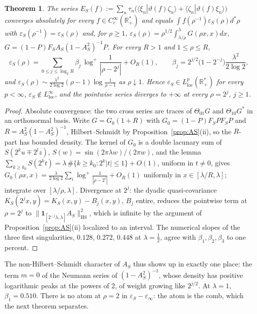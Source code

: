 \documentclass[11pt]{amsart}
\newtheorem{theorem}{Theorem}[section]
\theoremstyle{definition}
\theoremstyle{remark}
\newcommand{\R}{\mathbb R}
\begin{document}
\begin{theorem}\label{thm:L2}
The series $E_S(f):=\sum_n\tau_n\big(\langle\xi_n|\vartheta(f)\zeta_n\rangle+\langle\zeta_n|\vartheta(f)\xi_n\rangle\big)$ converges
absolutely for every $f\in C_c^\infty(\R_+^*)$ and equals $\int f(\rho^{-1})\varepsilon_S(\rho)d^*\rho$ with
$\varepsilon_S(\rho^{-1})=\varepsilon_S(\rho)$ and, for $\rho\ge1$,
$\varepsilon_S(\rho)=\rho^{1/2}\int_{\lambda/\rho}^\lambda G(\rho x,x)dx$, $G=(1-P)F_SA_S(1-A_S^2)^{-1}P$. For every $R>1$ and
$1\le\rho\le R$,
\[
\varepsilon_S(\rho)=\sum_{0\le j\le\log_2R}\beta_j\,\log^+\frac1{|\rho-2^j|}+O_R(1),\qquad
\beta_j=2^{j/2}\big(1-2^{-j}\big)\frac{\lambda^2}{2\log2},
\]
and $\varepsilon_S(\rho)\sim\frac{\lambda^2}{2\log2}(\rho-1)\log\frac1{\rho-1}$ as $\rho\downarrow1$. Hence
$\varepsilon_S\in L^p_{\mathrm{loc}}(\R_+^*)$ for every $p<\infty$, $\varepsilon_S\notin L^\infty_{\mathrm{loc}}$, and the pointwise
series diverges to $+\infty$ at every $\rho=2^j$, $j\ge1$.
\end{theorem}
\begin{proof}
Absolute convergence: the two cross series are traces of $\Theta_{01}G$ and $\Theta_{10}G^*$ in an orthonormal basis.
Write $G=G_0(1+R)$ with $G_0=(1-P)F_SPF_SP$ and $R=A_S^2(1-A_S^2)^{-1}$, Hilbert--Schmidt by Proposition~\ref{prop:AS}(ii), so
the $R$-part has bounded density. The kernel of $G_0$ is a double lacunary sum of $S(2^ku\mp2^lz)$,
$S(w)=\sin(2\pi\lambda w)/(2\pi w)$, and the lemma $\sum_{k\ge k_0}S(2^kt)=\lambda\,\#\{k\ge k_0:2^k|t|\le1\}+O(1)$, uniform in
$t\neq0$, gives $G_0(\rho x,x)=\frac{\lambda}{2\log2}\sum_i\log^+\frac1{|\rho-2^i|}+O_R(1)$ uniformly in $x\in[\lambda/R,\lambda]$;
integrate over $[\lambda/\rho,\lambda]$. Divergence at $2^j$: the dyadic quasi-covariance $K_S(2^jx,y)=K_S(x,y)-B_j(x,y)$, $B_j$
entire, reduces the pointwise term at $\rho=2^j$ to $\|\mathbf 1_{[2^{-j}\lambda,\lambda]}A_S\|_{\mathrm{HS}}^2$, which is infinite
by the argument of Proposition~\ref{prop:AS}(ii) localized to an interval. The numerical slopes of the three first
singularities, $0.128$, $0.272$, $0.448$ at $\lambda=\frac12$, agree with $\beta_1,\beta_2,\beta_3$ to one percent.
\end{proof}

The non-Hilbert--Schmidt character of $A_S$ thus shows up in exactly one place: the term $m=0$ of the Neumann series of
$(1-A_S^2)^{-1}$, whose density has positive logarithmic peaks at the powers of $2$, of weight growing like $2^{j/2}$. At
$\lambda=1$, $\beta_1=0.510$. There is no atom at $\rho=2$ in $\varepsilon_S-\varepsilon_\infty$: the atom is the comb, which
the next theorem separates.
\end{document}
